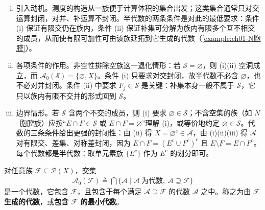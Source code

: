 \documentclass[../../main.tex]{subfiles}%
\begin{document}
\begin{remark}\label{remark:ch01-半代数}
\begin{enumerate}[(i)]
\item 引入动机。测度的构造从一族便于计算体积的集合出发；这类集合通常只对交运算封闭，对并、补运算不封闭。半代数的两条条件是对此的最低要求：条件 (i) 保证有限交仍在族内，条件 (ii) 保证补集可分解为族内有限多个互不相交的成员，从而使有限可加性可由该族延拓到它生成的代数（\cref{example:ch01-N胞腔}）。
\item 各项条件的作用。非空性排除空族这一退化情形：若 $\mathcal{S}=\varnothing$，则 (i)(ii) 空洞成立，而 $\mathcal{A}_0(\mathcal{S})=\{\varnothing,X\}$。条件 (i) 只要求对交封闭，故半代数不必含 $\varnothing$，也不必对并封闭。条件 (ii) 中要求 $F_j\in\mathcal{S}$ 是关键：补集本身一般不属于 $\mathcal{S}$，它只以族内有限不交并的形式回到 $\mathcal{S}$。
\item 边界情形。若 $\mathcal{S}$ 含两个不交的成员，则 (i) 要求 $\varnothing\in\mathcal{S}$；不含空集的族（如 $N$--胞腔族）应按“$E\cap F\in\mathcal{S}$ 或 $E\cap F=\varnothing$”理解 (i)，或等价地约定 $\varnothing\in\mathcal{S}$。代数的三条条件给出更强的封闭性：由 (ii) 得 $X=\varnothing^c\in\mathcal{A}$，由 (i)(ii)(iii) 得 $\mathcal{A}$ 对有限交、差集、对称差封闭，因为 $E\cap F=(E^c\cup F^c)^c$ 且 $E\setminus F=E\cap F^c$。每个代数都是半代数：取单元素族 $\{E^c\}$ 作为 $E^c$ 的划分即可。
\end{enumerate}
\end{remark}

对任意族 $\mathcal{F}\subseteq\mathcal{P}(X)$，交集
\begin{align*}
\mathcal{A}_0(\mathcal{F})\triangleq\bigcap\{\mathcal{A}\mid\mathcal{A}\ \text{为代数},\ \mathcal{A}\supseteq\mathcal{F}\}
\end{align*}
是一个代数，它包含 $\mathcal{F}$，且包含于每个满足 $\mathcal{A}\supseteq\mathcal{F}$ 的代数 $\mathcal{A}$ 之中。称之为由 $\mathcal{F}$ \textbf{生成的代数}，或\textbf{包含 $\mathcal{F}$ 的最小代数}。
\end{document}
